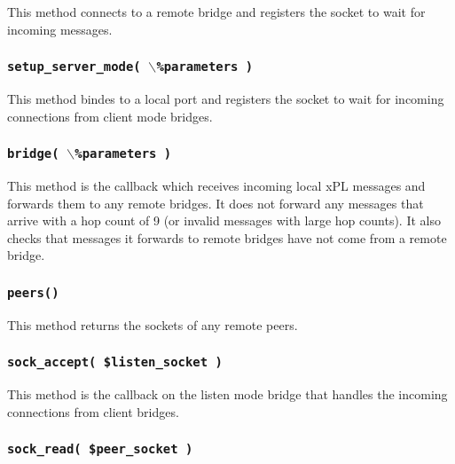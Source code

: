 \documentclass[12pt,a4paper]{article}
\begin{document}
This method connects to a remote bridge and registers the socket to
wait for incoming messages.

\subsubsection*{\texttt{setup\_server\_mode( $\backslash$\%parameters )}\label{xPL::Bridge_setup_server_mode_backslash_parameters_}}


This method bindes to a local port and registers the socket to wait
for incoming connections from client mode bridges.

\subsubsection*{\texttt{bridge( $\backslash$\%parameters )}\label{xPL::Bridge_bridge_backslash_parameters_}}


This method is the callback which receives incoming local xPL messages
and forwards them to any remote bridges.  It does not forward any
messages that arrive with a hop count of 9 (or invalid messages with
large hop counts).  It also checks that messages it forwards to remote
bridges have not come from a remote bridge.

\subsubsection*{\texttt{peers()}\label{xPL::Bridge_peers_}}


This method returns the sockets of any remote peers.

\subsubsection*{\texttt{sock\_accept( \$listen\_socket )}\label{xPL::Bridge_sock_accept_listen_socket_}}


This method is the callback on the listen mode bridge that handles the
incoming connections from client bridges.

\subsubsection*{\texttt{sock\_read( \$peer\_socket )}\label{xPL::Bridge_sock_read_peer_socket_}}
\end{document}
